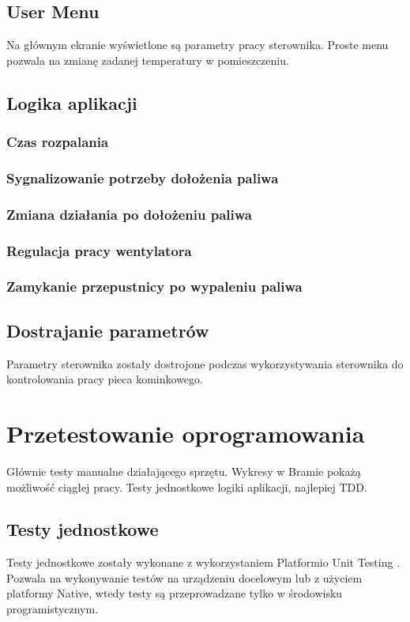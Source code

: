 \documentclass[11pt]{report}
\begin{document}
 \section{User Menu}
 Na głównym ekranie wyświetlone są parametry pracy sterownika.
 Proste menu pozwala na zmianę zadanej temperatury w pomieszczeniu.
 
 \section{Logika aplikacji}
 \subsection{Czas rozpalania}
 \subsection{Sygnalizowanie potrzeby dołożenia paliwa}
 \subsection{Zmiana działania po dołożeniu paliwa}
 \subsection{Regulacja pracy wentylatora}
 \subsection{Zamykanie przepustnicy po wypaleniu paliwa}
 
 \section{Dostrajanie parametrów}
 Parametry sterownika zostały dostrojone podczas wykorzystywania sterownika do kontrolowania pracy pieca kominkowego.
 
 
 \chapter{Przetestowanie oprogramowania}
 Głównie testy manualne działającego sprzętu.
 Wykresy w Bramie pokażą możliwość ciągłej pracy.
 Testy jednostkowe logiki aplikacji, najlepiej TDD.
 \section{Testy jednostkowe}
 Testy jednostkowe zostały wykonane z wykorzystaniem Platformio Unit Testing \cite{PIOUnitTesting}. Pozwala na wykonywanie testów na urządzeniu docelowym lub z użyciem platformy Native, wtedy testy są przeprowadzane tylko w środowisku programistycznym.
\end{document}
